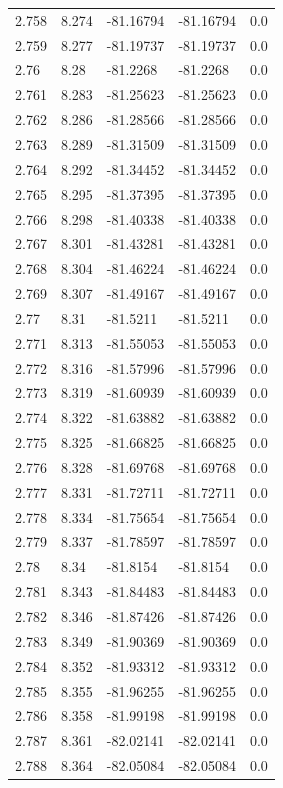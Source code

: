 \begin{tabular}{lllll}
2.758 & 8.274 & -81.16794 & -81.16794 & 0.0 \\
2.759 & 8.277 & -81.19737 & -81.19737 & 0.0 \\
2.76 & 8.28 & -81.2268 & -81.2268 & 0.0 \\
2.761 & 8.283 & -81.25623 & -81.25623 & 0.0 \\
2.762 & 8.286 & -81.28566 & -81.28566 & 0.0 \\
2.763 & 8.289 & -81.31509 & -81.31509 & 0.0 \\
2.764 & 8.292 & -81.34452 & -81.34452 & 0.0 \\
2.765 & 8.295 & -81.37395 & -81.37395 & 0.0 \\
2.766 & 8.298 & -81.40338 & -81.40338 & 0.0 \\
2.767 & 8.301 & -81.43281 & -81.43281 & 0.0 \\
2.768 & 8.304 & -81.46224 & -81.46224 & 0.0 \\
2.769 & 8.307 & -81.49167 & -81.49167 & 0.0 \\
2.77 & 8.31 & -81.5211 & -81.5211 & 0.0 \\
2.771 & 8.313 & -81.55053 & -81.55053 & 0.0 \\
2.772 & 8.316 & -81.57996 & -81.57996 & 0.0 \\
2.773 & 8.319 & -81.60939 & -81.60939 & 0.0 \\
2.774 & 8.322 & -81.63882 & -81.63882 & 0.0 \\
2.775 & 8.325 & -81.66825 & -81.66825 & 0.0 \\
2.776 & 8.328 & -81.69768 & -81.69768 & 0.0 \\
2.777 & 8.331 & -81.72711 & -81.72711 & 0.0 \\
2.778 & 8.334 & -81.75654 & -81.75654 & 0.0 \\
2.779 & 8.337 & -81.78597 & -81.78597 & 0.0 \\
2.78 & 8.34 & -81.8154 & -81.8154 & 0.0 \\
2.781 & 8.343 & -81.84483 & -81.84483 & 0.0 \\
2.782 & 8.346 & -81.87426 & -81.87426 & 0.0 \\
2.783 & 8.349 & -81.90369 & -81.90369 & 0.0 \\
2.784 & 8.352 & -81.93312 & -81.93312 & 0.0 \\
2.785 & 8.355 & -81.96255 & -81.96255 & 0.0 \\
2.786 & 8.358 & -81.99198 & -81.99198 & 0.0 \\
2.787 & 8.361 & -82.02141 & -82.02141 & 0.0 \\
2.788 & 8.364 & -82.05084 & -82.05084 & 0.0 \\

\end{tabular}
